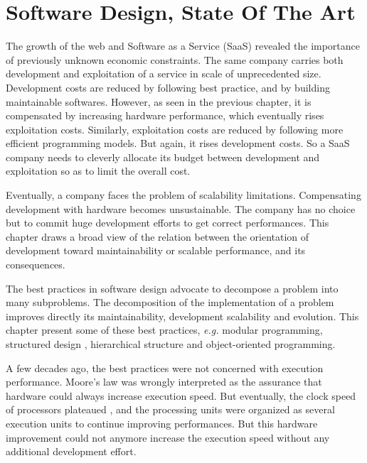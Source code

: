 \chapter{Software Design, State Of The Art} \label{chapter3}
\minitoc
\eject


The growth of the web and Software as a Service (SaaS) revealed the importance of previously unknown economic constraints.
The same company carries both development and exploitation of a service in scale of unprecedented size.
Development costs are reduced by following best practice, and by building maintainable softwares.
However, as seen in the previous chapter, it is compensated by increasing hardware performance, which eventually rises exploitation costs.
Similarly, exploitation costs are reduced by following more efficient programming models.
But again, it rises development costs.
So a SaaS company needs to cleverly allocate its budget between development and exploitation so as to limit the overall cost.

Eventually, a company faces the problem of scalability limitations.
Compensating development with hardware becomes unsustainable.
The company has no choice but to commit huge development efforts to get correct performances.
This chapter draws a broad view of the relation between the orientation of development toward maintainability or scalable performance, and its consequences.

The best practices in software design advocate to decompose a problem into many subproblems.
The decomposition of the implementation of a problem improves directly its maintainability, development scalability and evolution.
This chapter present some of these best practices, \textit{e.g.} modular programming, structured design \cite{Stevens1974}, hierarchical structure \cite{Dijkstra1968} and object-oriented programming.

A few decades ago, the best practices were not concerned with execution performance.
Moore's law \cite{Moore1965} was wrongly interpreted as the assurance that hardware could always increase execution speed.
But eventually, the clock speed of processors plateaued \cite{Bohr2007}, and the processing units were organized as several execution units to continue improving performances.
But this hardware improvement could not anymore increase the execution speed without any additional development effort.

